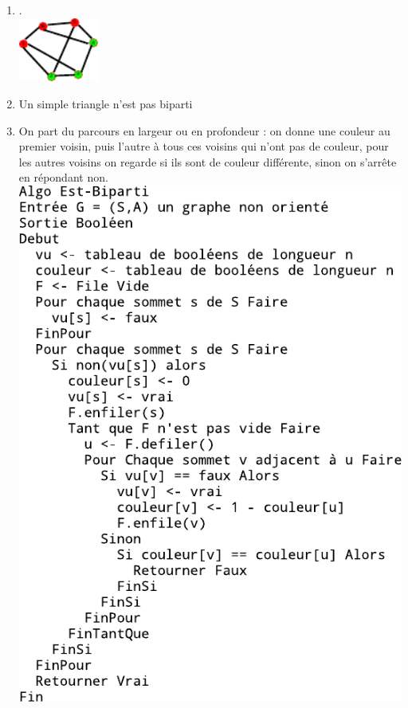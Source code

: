 \begin{enumerate}
	\item .\\ \includegraphics[width=100px]{Images/fig16.pdf}
	\item Un simple triangle n'est pas biparti
	\item On part du parcours en largeur ou en profondeur : on donne une couleur au premier voisin, puis l'autre à tous ces voisins qui n'ont pas de couleur, pour les autres voisins on regarde si ils sont de couleur différente, sinon on s'arrête en répondant non. \\ \includegraphics{Images/fig17.pdf}
\end{enumerate}

